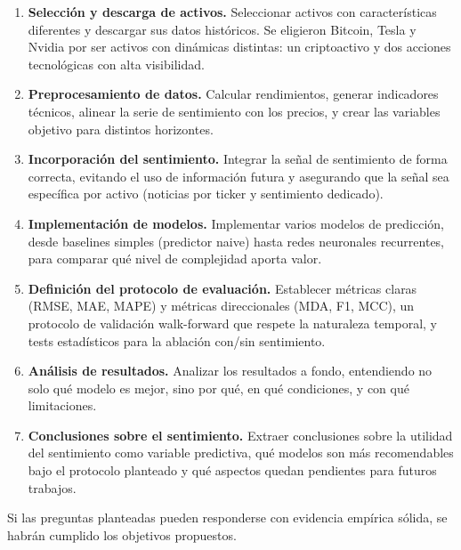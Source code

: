 \begin{enumerate}
    \item \textbf{Selección y descarga de activos.} Seleccionar activos con características diferentes y descargar sus datos históricos. Se eligieron Bitcoin, Tesla y Nvidia por ser activos con dinámicas distintas: un criptoactivo y dos acciones tecnológicas con alta visibilidad.
    
    \item \textbf{Preprocesamiento de datos.} Calcular rendimientos, generar indicadores técnicos, alinear la serie de sentimiento con los precios, y crear las variables objetivo para distintos horizontes.
    
    \item \textbf{Incorporación del sentimiento.} Integrar la señal de sentimiento de forma correcta, evitando el uso de información futura y asegurando que la señal sea específica por activo (noticias por ticker y sentimiento dedicado).
    
    \item \textbf{Implementación de modelos.} Implementar varios modelos de predicción, desde baselines simples (predictor naive) hasta redes neuronales recurrentes, para comparar qué nivel de complejidad aporta valor.
    
    \item \textbf{Definición del protocolo de evaluación.} Establecer métricas claras (RMSE, MAE, MAPE) y métricas direccionales (MDA, F1, MCC), un protocolo de validación walk-forward que respete la naturaleza temporal, y tests estadísticos para la ablación con/sin sentimiento.
    
    \item \textbf{Análisis de resultados.} Analizar los resultados a fondo, entendiendo no solo qué modelo es mejor, sino por qué, en qué condiciones, y con qué limitaciones.
    
    \item \textbf{Conclusiones sobre el sentimiento.} Extraer conclusiones sobre la utilidad del sentimiento como variable predictiva, qué modelos son más recomendables bajo el protocolo planteado y qué aspectos quedan pendientes para futuros trabajos.
\end{enumerate}

Si las preguntas planteadas pueden responderse con evidencia empírica sólida, se habrán cumplido los objetivos propuestos.
